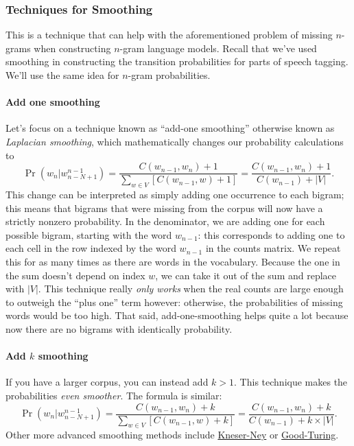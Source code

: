 \documentclass[12pt]{article}
\begin{document}
\subsubsection{Techniques for Smoothing} This is a technique that can help with the aforementioned problem of missing $n$-grams when constructing $n$-gram language models. Recall that we've used smoothing in constructing the transition probabilities for parts of speech tagging. We'll use the same idea for $n$-gram probabilities.

\paragraph{Add one smoothing}
Let's focus on a technique known as ``add-one smoothing'' otherwise known as \emph{Laplacian smoothing}, which mathematically changes our probability calculations to
\[
  \Pr(w_n | w_{n-N+1}^{n-1}) = \frac{C(w_{n-1}, w_n) + 1}{\sum_{w \in V} \left[C(w_{n-1}, w) + 1\right]} = \frac{C(w_{n-1}, w_n) + 1}{C(w_{n-1}) + |V|}.
\]
This change can be interpreted as simply adding one occurrence to each bigram; this means that bigrams that were missing from the corpus will now have a strictly nonzero probability. In the denominator, we are adding one for each possible bigram, starting with the word $w_{n-1}$: this corresponds to adding one to each cell in the row indexed by the word $w_{n-1}$ in the counts matrix. We repeat this for as many times as there are words in the vocabulary. Because the one in the sum doesn't depend on index $w$, we can take it out of the sum and replace with $|V|$. This technique really \emph{only works} when the real counts are large enough to outweigh the ``plus one'' term however: otherwise, the probabilities of missing words would be too high. That said, add-one-smoothing helps quite a lot because now there are no bigrams with identically probability.

\paragraph{Add $k$ smoothing} If you have a larger corpus, you can instead add $k > 1$. This technique makes the probabilities \emph{even smoother}. The formula is similar:
\[
  \Pr(w_n | w_{n-N+1}^{n-1}) = \frac{C(w_{n-1}, w_n) + k}{\sum_{w \in V} \left[C(w_{n-1}, w) + k\right]} = \frac{C(w_{n-1}, w_n) + k}{C(w_{n-1}) + k \times |V|}.
\]
Other more advanced smoothing methods include \href{https://en.wikipedia.org/wiki/Kneser%E2%80%93Ney_smoothing}{Kneser-Ney} or   \href{https://en.wikipedia.org/wiki/Good%E2%80%93Turing_frequency_estimation}{Good-Turing}.
\end{document}
